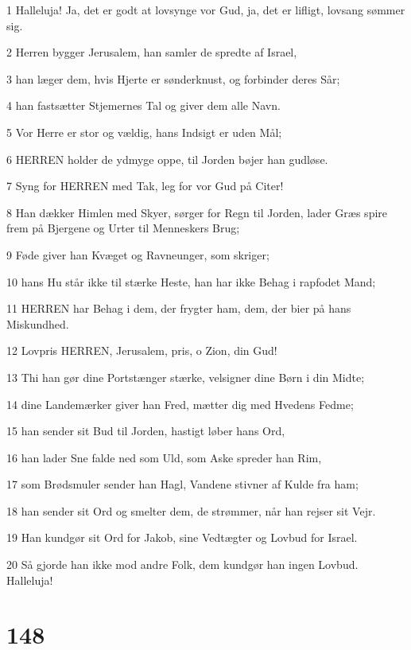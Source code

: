 \par 1 Halleluja! Ja, det er godt at lovsynge vor Gud, ja, det er lifligt, lovsang sømmer sig.
\par 2 Herren bygger Jerusalem, han samler de spredte af Israel,
\par 3 han læger dem, hvis Hjerte er sønderknust, og forbinder deres Sår;
\par 4 han fastsætter Stjemernes Tal og giver dem alle Navn.
\par 5 Vor Herre er stor og vældig, hans Indsigt er uden Mål;
\par 6 HERREN holder de ydmyge oppe, til Jorden bøjer han gudløse.
\par 7 Syng for HERREN med Tak, leg for vor Gud på Citer!
\par 8 Han dækker Himlen med Skyer, sørger for Regn til Jorden, lader Græs spire frem på Bjergene og Urter til Menneskers Brug;
\par 9 Føde giver han Kvæget og Ravneunger, som skriger;
\par 10 hans Hu står ikke til stærke Heste, han har ikke Behag i rapfodet Mand;
\par 11 HERREN har Behag i dem, der frygter ham, dem, der bier på hans Miskundhed.
\par 12 Lovpris HERREN, Jerusalem, pris, o Zion, din Gud!
\par 13 Thi han gør dine Portstænger stærke, velsigner dine Børn i din Midte;
\par 14 dine Landemærker giver han Fred, mætter dig med Hvedens Fedme;
\par 15 han sender sit Bud til Jorden, hastigt løber hans Ord,
\par 16 han lader Sne falde ned som Uld, som Aske spreder han Rim,
\par 17 som Brødsmuler sender han Hagl, Vandene stivner af Kulde fra ham;
\par 18 han sender sit Ord og smelter dem, de strømmer, når han rejser sit Vejr.
\par 19 Han kundgør sit Ord for Jakob, sine Vedtægter og Lovbud for Israel.
\par 20 Så gjorde han ikke mod andre Folk, dem kundgør han ingen Lovbud. Halleluja!

\chapter{148}


